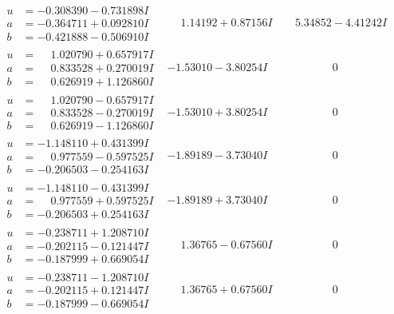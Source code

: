 \documentclass[1p]{elsarticle_modified}
\theoremstyle{definition}
\begin{document}
$$\begin{array}{c|c|c}
\begin{aligned}
u &= -0.308390 - 0.731898 I \\
a &= -0.364711 + 0.092810 I \\
b &= -0.421888 - 0.506910 I\end{aligned}
 & \phantom{-}1.14192 + 0.87156 I & \phantom{-}5.34852 - 4.41242 I \\ \hline\begin{aligned}
u &= \phantom{-}1.020790 + 0.657917 I \\
a &= \phantom{-}0.833528 + 0.270019 I \\
b &= \phantom{-}0.626919 + 1.126860 I\end{aligned}
 & -1.53010 - 3.80254 I & \phantom{-0.000000 } 0 \\ \hline\begin{aligned}
u &= \phantom{-}1.020790 - 0.657917 I \\
a &= \phantom{-}0.833528 - 0.270019 I \\
b &= \phantom{-}0.626919 - 1.126860 I\end{aligned}
 & -1.53010 + 3.80254 I & \phantom{-0.000000 } 0 \\ \hline\begin{aligned}
u &= -1.148110 + 0.431399 I \\
a &= \phantom{-}0.977559 - 0.597525 I \\
b &= -0.206503 - 0.254163 I\end{aligned}
 & -1.89189 - 3.73040 I & \phantom{-0.000000 } 0 \\ \hline\begin{aligned}
u &= -1.148110 - 0.431399 I \\
a &= \phantom{-}0.977559 + 0.597525 I \\
b &= -0.206503 + 0.254163 I\end{aligned}
 & -1.89189 + 3.73040 I & \phantom{-0.000000 } 0 \\ \hline\begin{aligned}
u &= -0.238711 + 1.208710 I \\
a &= -0.202115 - 0.121447 I \\
b &= -0.187999 + 0.669054 I\end{aligned}
 & \phantom{-}1.36765 - 0.67560 I & \phantom{-0.000000 } 0 \\ \hline\begin{aligned}
u &= -0.238711 - 1.208710 I \\
a &= -0.202115 + 0.121447 I \\
b &= -0.187999 - 0.669054 I\end{aligned}
 & \phantom{-}1.36765 + 0.67560 I & \phantom{-0.000000 } 0 \\ \hline\begin{aligned}

\end{aligned}
\end{array}$$
\end{document}
